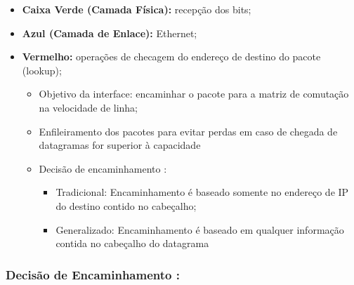         \begin{itemize}[left=0.5cm, align=left, nosep]    
            \item \textbf{Caixa Verde (Camada Física):} recepção dos bits;
            \item \textbf{Azul (Camada de Enlace):} Ethernet;
            \item \textbf{Vermelho:} operações de checagem do endereço de destino do pacote (lookup); 
            
            \begin{itemize}[left=0.5cm, nosep, label=$\hookrightarrow$]
                \item Objetivo da interface: encaminhar o pacote para a matriz de comutação na velocidade de linha; 
                \item Enfileiramento dos pacotes para evitar perdas em caso de chegada de datagramas for superior à capacidade
                \item Decisão de encaminhamento :
                
                \begin{itemize}[left=0.5cm, nosep, label=$-$]
                    \item Tradicional: Encaminhamento é baseado somente no endereço de IP do destino contido no cabeçalho;
                    \item Generalizado: Encaminhamento é baseado em qualquer informação contida no cabeçalho do datagrama
                \end{itemize}
        
            \end{itemize}
        
        \end{itemize}

        \subsubsection*{Decisão de Encaminhamento :} 
    
